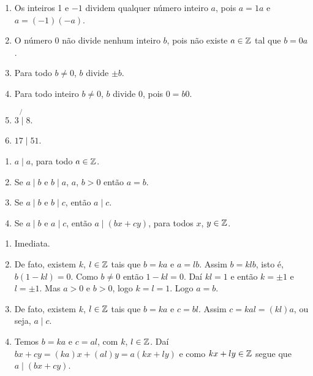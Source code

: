 \begin{exemplos}
	\begin{enumerate}
		\item Os inteiros 1 e $-1$ dividem qualquer n{\'u}mero inteiro $a$, pois $a = 1 a$ e $a = (-1)(-a)$.
		\item O n{\'u}mero 0 n{\~a}o divide nenhum inteiro $b$, pois n{\~a}o existe $a \in \mathbb{Z}$ tal que $b = 0a$.
		\item Para todo $b\neq 0$, $b$ divide $\pm b$.
		\item Para todo inteiro $b\neq 0$, $b$ divide 0, pois $0 = b0$.
		\item $3 \not{\mid} 8$.
		\item $17 \mid 51$.
	\end{enumerate}	
\end{exemplos}


\begin{proposicao}
	\begin{enumerate}
		\item $a\mid a$, para todo $a \in \mathbb{Z}$.
		\item Se $a\mid b$ e $b\mid a$, $a$, $b > 0$ então $a = b$.
		\item Se $a\mid b$ e $b\mid c$, ent{\~a}o $a\mid c$.
		\item Se $a\mid b$ e $a\mid c$, ent{\~a}o $a\mid (bx+cy)$, para todos $x$, $y \in \mathbb{Z}$.
	\end{enumerate}
\end{proposicao}
\begin{prova}
	\begin{enumerate}
		\item Imediata.
		
		\item De fato, existem $k$, $l \in \mathbb{Z} $ tais que $b = ka$ e $a = lb$. Assim $b = klb$, isto é, $b(1 - kl) = 0$.
		Como $b \ne 0$ então $1 - kl = 0$. Daí $kl = 1$ e então $k = \pm 1$ e $l = \pm 1$. Mas $a > 0$ e $b > 0$, logo $k = l =1$. Logo $a = b$.

		\item De fato, existem $k$, $l \in \mathbb{Z}$ tais que $b = ka$ e $c = bl$. Assim  $c = kal = (kl)a$, ou seja, $a\mid c$.

		\item Temos $b = ka$ e $c = al$, com $k$, $l \in \mathbb{Z}$. Daí $bx + cy = (ka)x + (al)y = a(kx + ly)$ e como $kx + ly \in \mathbb{Z}$ segue que $a \mid (bx + cy)$.
	\end{enumerate}
\end{prova}

